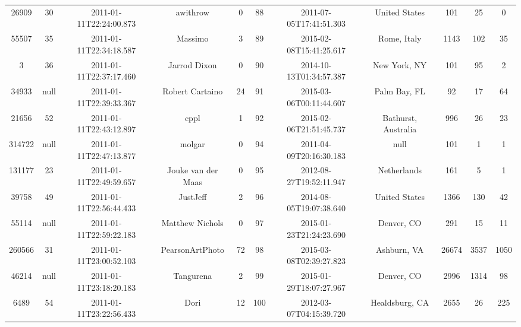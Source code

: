 \documentclass[12pt,a4paper,twoside,openright,titlepage,final]{article}
\begin{document}
\begin{landscape}
\begin{center}
\begin{longtable}{@{\extracolsep{\fill}}*{11}{c}}
			26909     & 30   & 2011-01-11T22:24:00.873 & awithrow              & 0         & 88    & 2011-07-05T17:41:51.303 & United States                    & 101        & 25      & 0     \\
			55507     & 35   & 2011-01-11T22:34:18.587 & Massimo               & 3         & 89    & 2015-02-08T15:41:25.617 & Rome, Italy                      & 1143       & 102     & 35    \\
			3         & 36   & 2011-01-11T22:37:17.460 & Jarrod Dixon          & 0         & 90    & 2014-10-13T01:34:57.387 & New York, NY                     & 101        & 95      & 2     \\
			34933     & null & 2011-01-11T22:39:33.367 & Robert Cartaino       & 24        & 91    & 2015-03-06T00:11:44.607 & Palm Bay, FL                     & 92         & 17      & 64    \\
			21656     & 52   & 2011-01-11T22:43:12.897 & cppl                  & 1         & 92    & 2015-02-06T21:51:45.737 & Bathurst, Australia              & 996        & 26      & 23    \\
			314722    & null & 2011-01-11T22:47:13.877 & molgar                & 0         & 94    & 2011-04-09T20:16:30.183 & null                             & 101        & 1       & 1     \\
			131177    & 23   & 2011-01-11T22:49:59.657 & Jouke van der Maas    & 0         & 95    & 2012-08-27T19:52:11.947 & Netherlands                      & 161        & 5       & 1     \\
			39758     & 49   & 2011-01-11T22:56:44.433 & JustJeff              & 2         & 96    & 2014-08-05T19:07:38.640 & United States                    & 1366       & 130     & 42    \\
			55114     & null & 2011-01-11T22:59:22.183 & Matthew Nichols       & 0         & 97    & 2015-01-23T21:24:23.690 & Denver, CO                       & 291        & 15      & 11    \\
			260566    & 31   & 2011-01-11T23:00:52.103 & PearsonArtPhoto       & 72        & 98    & 2015-03-08T02:39:27.823 & Ashburn, VA                      & 26674      & 3537    & 1050  \\
			46214     & null & 2011-01-11T23:18:20.183 & Tangurena             & 2         & 99    & 2015-01-29T18:07:27.967 & Denver, CO                       & 2996       & 1314    & 98    \\
			6489      & 54   & 2011-01-11T23:22:56.433 & Dori                  & 12        & 100   & 2012-03-07T04:15:39.720 & Healdsburg, CA                   & 2655       & 26      & 225   \\

\end{longtable}
\end{center}
\end{landscape}
\end{document}
